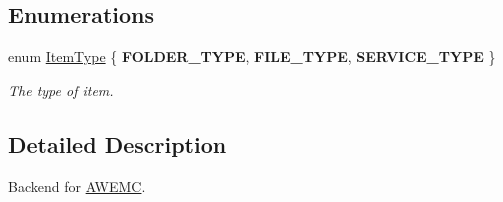 \subsection*{Enumerations}
\begin{DoxyCompactItemize}
\item 
enum \hyperlink{namespace_a_w_e_ad175a5b8a86bf7848825c9bd94c41470}{Item\-Type} \{ {\bfseries F\-O\-L\-D\-E\-R\-\_\-\-T\-Y\-P\-E}, 
{\bfseries F\-I\-L\-E\-\_\-\-T\-Y\-P\-E}, 
{\bfseries S\-E\-R\-V\-I\-C\-E\-\_\-\-T\-Y\-P\-E}
 \}
\begin{DoxyCompactList}\small\item\em The type of item. \end{DoxyCompactList}\end{DoxyCompactItemize}


\subsection{Detailed Description}
Backend for \hyperlink{class_a_w_e_1_1_a_w_e_m_c}{A\-W\-E\-M\-C}. 